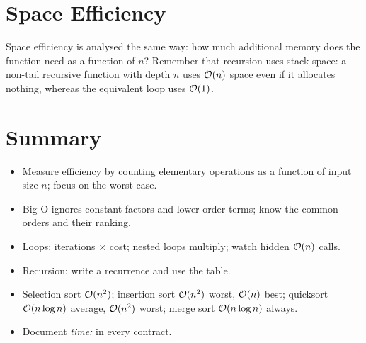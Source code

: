 \section{Space Efficiency}

Space efficiency is analysed the same way: how much additional memory does the function need as
a function of $n$? Remember that recursion uses stack space: a non-tail recursive function with
depth $n$ uses $\mathcal{O}(n)$ space even if it allocates nothing, whereas the equivalent loop uses
$\mathcal{O}(1)$.

\section{Summary}
\begin{itemize}
  \item Measure efficiency by counting elementary operations as a function of input size $n$;
    focus on the worst case.
  \item Big-O ignores constant factors and lower-order terms; know the common orders and their
    ranking.
  \item Loops: iterations $\times$ cost; nested loops multiply; watch hidden $\mathcal{O}(n)$ calls.
  \item Recursion: write a recurrence and use the table.
  \item Selection sort $\mathcal{O}(n^2)$; insertion sort $\mathcal{O}(n^2)$ worst, $\mathcal{O}(n)$ best; quicksort
    $\mathcal{O}(n \log n)$ average, $\mathcal{O}(n^2)$ worst; merge sort $\mathcal{O}(n \log n)$ always.
  \item Document \emph{time:} in every contract.
\end{itemize}

